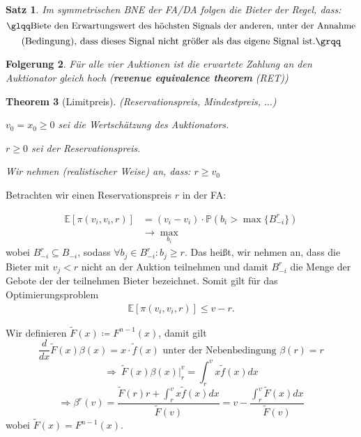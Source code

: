 \documentclass[12pt]{extreport} %
\theoremstyle{named}
\newtheorem{unnamedtheorem}{Theorem} \counterwithin{unnamedtheorem}{chapter}
\theoremstyle{itshape}
\newtheorem{satz}[unnamedtheorem]{Satz}
\theoremstyle{normal}
\newtheorem{folgerung}[unnamedtheorem]{Folgerung}
\begin{document}
\begin{satz}
	Im symmetrischen BNE der FA/DA folgen die Bieter der Regel, dass: 
	$$ \text{{\glqq}Biete den Erwartungswert des höchsten Signals der anderen, unter der Annahme} $$
	$$ \text{(Bedingung), dass dieses Signal nicht größer als das eigene Signal ist.\grqq} $$
\end{satz}

\begin{folgerung}
	Für alle vier Auktionen ist die erwartete Zahlung an den Auktionator gleich hoch (\textbf{revenue equivalence theorem} (RET))
\end{folgerung}

\begin{unnamedtheorem}[Limitpreis] (Reservationspreis, Mindestpreis, $\dotsc$) 
\begin{description}
	\item $v_{0} = x_{0} \geq 0$ sei die Wertschätzung des Auktionators.
	\item $r \geq 0$ sei der Reservationspreis.
\end{description}

Wir nehmen (realistischer Weise) an, dass: $r \geq v_{0}$		
\end{unnamedtheorem}

Betrachten wir einen Reservationspreis $r$ in der FA:

\begin{align*}
	\mathbb{E}\left[ \pi\left(v_{i}, v_{i}, r \right) \right] & = \left( v_{i} - v_{i} \right) \cdot \mathbb{P}\left( b_{i} > \max \{ B_{-i}^{r} \} \right) \\
	& \rightarrow \max_{b_{i}}
\end{align*}
wobei $B_{-i}^{r} \subseteq B_{-i}$, sodass $\forall b_{j} \in B_{-i}^{r}: b_{j} \geq r$. Das heißt, wir nehmen an, dass die Bieter mit $v_{j} < r$ nicht an der Auktion teilnehmen und damit $B_{-i}^{r}$ die Menge der Gebote der der teilnehmen Bieter bezeichnet. Somit gilt für das Optimierungsproblem
\begin{align*}
	\mathbb{E}\left[ \pi\left(v_{i}, v_{i}, r \right) \right] \leq v - r.
\end{align*}

Wir definieren $\tilde{F}(x) \coloneqq F^{n-1}(x)$, damit gilt
$$ \frac{d}{dx} \tilde{F}(x) \beta(x) = x \cdot \tilde{f}(x) \text{ unter der Nebenbedingung } \beta(r) = r $$
$$ \Rightarrow ~ \tilde{F}(x) \beta(x) \big|^{v}_{r} = \int_{r}^{v} x \tilde{f}(x) dx $$
$$ \Rightarrow \beta^{r}(v) = \frac{\tilde{F}(r)r + \int_{r}^{v} x \tilde{f}(x) dx}{\tilde{F}(v)} = v - \frac{\int_{r}^{v} \tilde{F}(x) dx}{\tilde{F}(v)} $$
wobei $\tilde{F}(x) = F^{n-1}(x)$. \\
\end{document}
